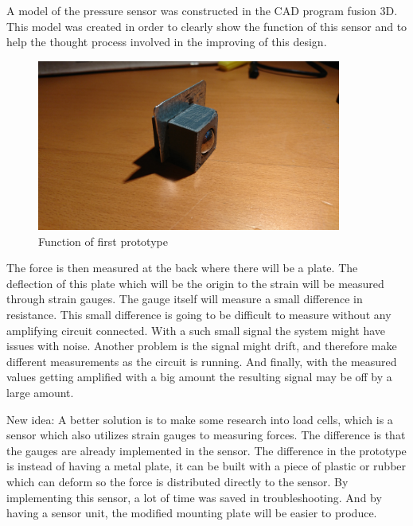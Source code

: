 A model of the pressure sensor was constructed in the CAD program fusion 3D. This model was created in order to clearly show the function of this sensor and to help the thought process involved in the improving of this design.

\begin{figure}[H]%
\begin{center}
	\includegraphics[width = 10cm]{Figures/Press_sens_prot_1.png}
	\caption{Function of first prototype}
	\label{Press_sens_prot_1}
\end{center}
\end{figure}
 The force is then measured at the back where there will be a plate. The deflection of this plate which will be the origin to the strain will be measured through strain gauges. 
The gauge itself will measure a small difference in resistance. This small difference is going to be difficult to measure without any amplifying circuit connected. With a such small signal the system might have issues with noise. Another problem is the signal might drift, and therefore make different measurements as the circuit is running. And finally, with the measured values getting amplified with a big amount the resulting signal may be off by a large amount. 

New idea:
A better solution is to make some research into load cells, which is a sensor which also utilizes strain gauges to measuring forces. The difference is that the gauges are already implemented in the sensor. The difference in the prototype is instead of having a metal plate, it can be built with a piece of plastic or rubber which can deform so the force is distributed directly to the sensor. By implementing this sensor, a lot of time was saved in troubleshooting. And by having a sensor unit, the modified mounting plate will be easier to produce. 
 
